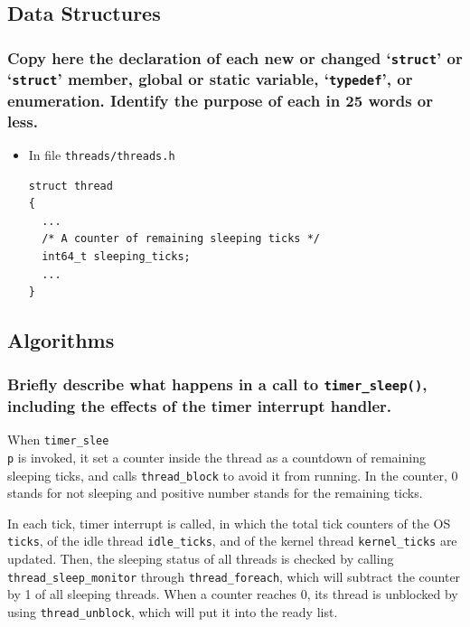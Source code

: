 \documentclass[sigconf, nonacm, balance=false, urlbreakonhyphens=true]{acmart}
\begin{document}
        \label{Alarm Clock}
    
        \subsection{Data Structures}
        
            \subsubsection{Copy here the declaration of each new or changed `\texttt{struct}' or `\texttt{struct}' member, global or static variable, `\texttt{typedef}', or enumeration. Identify the purpose of each in 25 words or less. } 
            
                \begin{itemize}
                    \item In file \texttt{threads/threads.h}
\begin{verbatim}
struct thread
{
  ...
  /* A counter of remaining sleeping ticks */
  int64_t sleeping_ticks;
  ...
}\end{verbatim}
                \end{itemize}
        
        \subsection{Algorithms}
        
            \subsubsection{Briefly describe what happens in a call to \texttt{timer\_sleep()}, including the effects of the timer interrupt handler. }
                When \texttt{timer\_slee\\p} is invoked, it set a counter inside the thread as a countdown of remaining sleeping ticks, and calls \texttt{thread\_block} to avoid it from running. In the counter, 0 stands for not sleeping and positive number stands for the remaining ticks.
            
                In each tick, timer interrupt is called, in which the total tick counters of the OS \texttt{ticks}, of the idle thread \texttt{idle\_ticks}, and of the kernel thread \texttt{kernel\_ticks} are updated. Then, the sleeping status of all threads is checked by calling \texttt{thread\_sleep\_monitor} through \texttt{thread\_foreach}, which will subtract the counter by 1 of all sleeping threads. When a counter reaches 0, its thread is unblocked by using \texttt{thread\_unblock}, which will put it into the ready list. 
            
\end{document}
